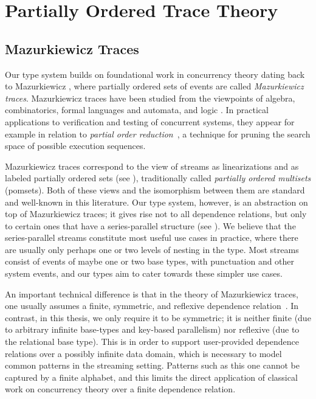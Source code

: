 \section{Partially Ordered Trace Theory}

\subsection{Mazurkiewicz Traces}

Our type system builds on foundational work in concurrency theory dating back to Mazurkiewicz \cite{mazurkiewicz1986trace}, where partially ordered sets of events are called \emph{Mazurkiewicz traces}. Mazurkiewicz traces have been studied from the viewpoints of algebra, combinatorics, formal languages and automata, and
logic \cite{DiekertR1995}. In practical applications to verification and
testing of concurrent systems, they appear for example in relation to
\emph{partial order reduction}~\cite{God96,Peled94}, a technique for
pruning the search space of possible execution sequences.

Mazurkiewicz traces correspond to the view of streams as linearizations and as labeled partially ordered sets (see ),
traditionally called \emph{partially ordered multisets} (pomsets).
Both of these views and the isomorphism between them are standard and well-known in this literature.
Our type system, however, is an abstraction on top of Mazurkiewicz traces; it
gives rise not to all dependence relations, but only to certain ones that have a series-parallel structure
(see ).
We believe that the series-parallel streams constitute most useful use cases in practice, where there are usually only perhaps one or two levels of nesting in the type. Most streams consist of events of maybe one or two base types, with punctuation and other system events, and our types aim to cater towards these simpler use cases.

An important technical difference is that in the theory of Mazurkiewicz traces, one usually assumes a finite, symmetric, and reflexive dependence relation~\cite{DiekertR1995}. In contrast, in this thesis, we only require it to be symmetric; it is neither finite (due to arbitrary infinite base-types and key-based parallelism) nor reflexive (due to the relational base type). This is in order to support user-provided dependence relations over a possibly infinite data domain, which is necessary to model common patterns in the streaming setting. Patterns such as this one cannot be captured by a finite alphabet, and this limits the direct application of classical work on concurrency theory over a finite dependence relation.

